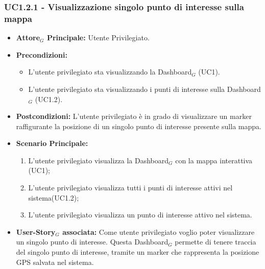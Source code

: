 \documentclass[11pt]{article}
\begin{document}
\begin{justify}
\subsubsection{\textbf{UC1.2.1 - Visualizzazione singolo punto di interesse sulla mappa}}
\label{UC1.2.1}
\begin{itemize}
     \item \textbf{Attore$_G$ Principale:} Utente Privilegiato.
     \item \textbf{Precondizioni:}
        \begin{itemize}
    		\item L'utente privilegiato sta visualizzando la Dashboard$_G$ (UC1).
    		\item L'utente privilegiato sta visualizzando i punti di interesse sulla Dashboard$_G$ (UC1.2).
        \end{itemize}
     \item \textbf{Postcondizioni:} L'utente privilegiato è in grado di visualizzare un marker raffigurante la posizione di un singolo punto di interesse presente sulla mappa.
     \item \textbf{Scenario Principale:}
        \begin{enumerate}
            \item L'utente privilegiato visualizza la Dashboard$_G$ con la mappa interattiva (UC1);
            \item L'utente privilegiato visualizza tutti i punti di interesse attivi nel sistema(UC1.2);
            \item L'utente privilegiato visualizza un punto di interesse attivo nel sistema.
        \end{enumerate}
     \item \textbf{User-Story$_G$ associata:}
     Come utente privilegiato voglio poter visualizzare un singolo punto di interesse. Questa Dashboard$_G$ permette di tenere traccia del singolo punto di interesse, tramite un marker che rappresenta la posizione GPS salvata nel sistema.
\end{itemize}

\end{justify}
\end{document}
